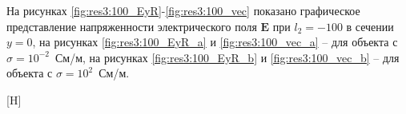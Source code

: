 \documentclass[a4paper,14pt]{article}
\makeatletter
\renewenvironment{figure}[1][\fps@figure]{
  \edef\@tempa{\noexpand\@float{figure}[#1]}
  \@tempa
  \addtocounter{foofigure}{1}
}{
  \end@float
}
\renewcommand{\Re}{\mathop{\mathrm{Re}}\nolimits}
\makeatother
\begin{document}
На рисунках \ref{fig:res3:100_EyR}-\ref{fig:res3:100_vec} показано графическое представление напряженности электрического поля $\mathbf{E}$ при $l_2=-100$ в сечении $y=0$, на рисунках \ref{fig:res3:100_EyR_a} и \ref{fig:res3:100_vec_a} -- для объекта с $\sigma=10^{-2}$~См/м, на рисунках \ref{fig:res3:100_EyR_b} и \ref{fig:res3:100_vec_b} -- для объекта с $\sigma=10^{2}$~См/м.

\begin{figure}[H]
	\centering
	\text{~~}
	\caption{$\Re(\mathbf{E}_y)$ при $l_2=-100$}
	\label{fig:res3:100_EyR}
\end{figure}
\end{document}
